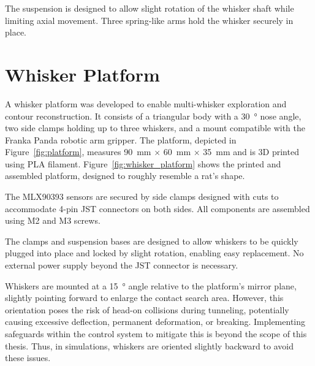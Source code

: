 The suspension is designed to allow slight rotation of the whisker shaft while limiting axial movement.
Three spring-like arms hold the whisker securely in place.


\section{Whisker Platform}

A whisker platform was developed to enable multi-whisker exploration and contour reconstruction.
It consists of a triangular body with a \SI{30}{\degree} nose angle, two side clamps holding up to three whiskers, and a mount compatible with the Franka Panda robotic arm gripper.
The platform, depicted in Figure~\ref{fig:platform}, measures \SI{90}{\milli\meter} $\times$ \SI{60}{\milli\meter} $\times$ \SI{35}{\milli\meter} and is 3D printed using PLA filament.
Figure~\ref{fig:whisker_platform} shows the printed and assembled platform, designed to roughly resemble a rat's shape.

The MLX90393 sensors are secured by side clamps designed with cuts to accommodate 4-pin JST connectors on both sides.
All components are assembled using M2 and M3 screws.

The clamps and suspension bases are designed to allow whiskers to be quickly plugged into place and locked by slight rotation, enabling easy replacement.
No external power supply beyond the JST connector is necessary.

Whiskers are mounted at a \SI{15}{\degree} angle relative to the platform's mirror plane, slightly pointing forward to enlarge the contact search area.
However, this orientation poses the risk of head-on collisions during tunneling, potentially causing excessive deflection, permanent deformation, or breaking.
Implementing safeguards within the control system to mitigate this is beyond the scope of this thesis.
Thus, in simulations, whiskers are oriented slightly backward to avoid these issues.

